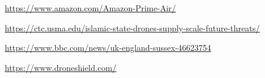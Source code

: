 \documentclass[conference,a4paper]{IEEEtran}
\begin{document}




\begin{thebibliography}{1}
    \url{https://www.amazon.com/Amazon-Prime-Air/}

    \url{https://ctc.usma.edu/islamic-state-drones-supply-scale-future-threats/}

    \url{https://www.bbc.com/news/uk-england-sussex-46623754}

    \url{https://www.droneshield.com/}

\end{thebibliography}
\end{document}
